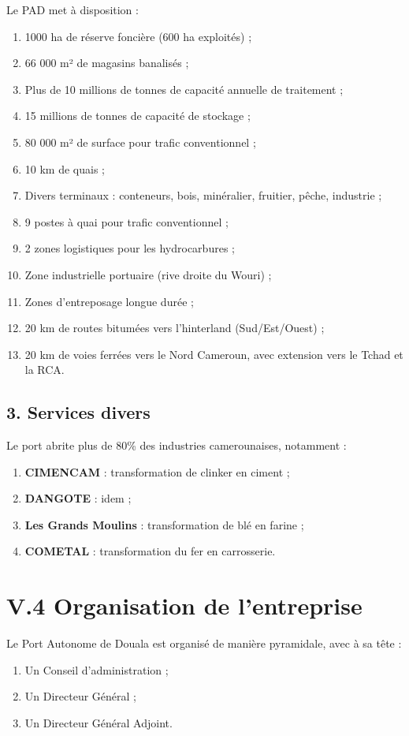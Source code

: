 \documentclass[a4paper,12pt,openany]{report}
\begin{document}
	Le PAD met à disposition :
	\begin{enumerate}
		\item 1000 ha de réserve foncière (600 ha exploités) ;
		\item 66 000 m² de magasins banalisés ;
		\item Plus de 10 millions de tonnes de capacité annuelle de traitement ;
		\item 15 millions de tonnes de capacité de stockage ;
		\item 80 000 m² de surface pour trafic conventionnel ;
		\item 10 km de quais ;
		\item Divers terminaux : conteneurs, bois, minéralier, fruitier, pêche, industrie ;
		\item 9 postes à quai pour trafic conventionnel ;
		\item 2 zones logistiques pour les hydrocarbures ;
		\item Zone industrielle portuaire (rive droite du Wouri) ;
		\item Zones d’entreposage longue durée ;
		\item 20 km de routes bitumées vers l’hinterland (Sud/Est/Ouest) ;
		\item 20 km de voies ferrées vers le Nord Cameroun, avec extension vers le Tchad et la RCA.
	\end{enumerate}
	
	\subsection*{3. Services divers}
	
	Le port abrite plus de 80\% des industries camerounaises, notamment :
	\begin{enumerate}
		\item \textbf{CIMENCAM} : transformation de clinker en ciment ;
		\item \textbf{DANGOTE} : idem ;
		\item \textbf{Les Grands Moulins} : transformation de blé en farine ;
		\item \textbf{COMETAL} : transformation du fer en carrosserie.
	\end{enumerate}
	
	\section*{V.4 Organisation de l’entreprise }
	
	Le Port Autonome de Douala est organisé de manière pyramidale, avec à sa tête :
	\begin{enumerate}
		\item Un Conseil d’administration ;
		\item Un Directeur Général ;
		\item Un Directeur Général Adjoint.
	\end{enumerate}
	
\end{document}
